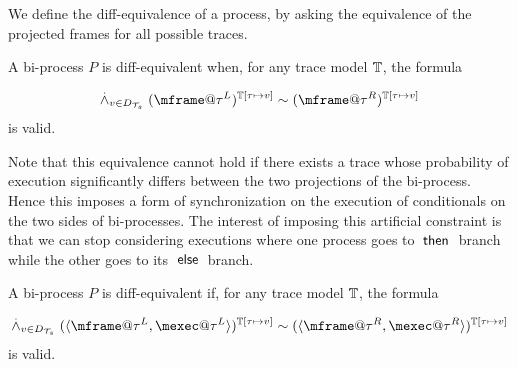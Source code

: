 We define the diff-equivalence of a process, by asking the equivalence of the projected frames for all possible traces.

\begin{definition}
  \label{def:process-equiv}
  A bi-process $P$ is diff-equivalent when,
  for any trace model $\mathbb{T}$, the formula

  \[\stackrel{.}{\wedge}_{v\in D_\XT} (\mframe@\tau^L)^{\TM[\tau\mapsto v]} \sim (\mframe@\tau^R)^{\TM[\tau \mapsto v]}\]
  is valid.
\end{definition}
Note that this equivalence cannot hold if there exists a trace
whose probability of execution significantly differs between the two
projections of the bi-process.
Hence this imposes a form of synchronization on the execution of
conditionals on the two sides of bi-processes.
The interest of imposing this artificial constraint is that we
can stop considering executions where one process goes to $\;\textsf{then}\;$
branch while the other goes to its $\;\textsf{else}\;$ branch. 
\begin{lemma}
  A bi-process $P$ is diff-equivalent if,
  for any trace model $\mathbb{T}$, the formula

  \[\stackrel{.}{\wedge}_{v\in D_\XT} (\pair{\mframe@\tau^L,\mexec@\tau^L})^{\TM[\tau\mapsto v]} \sim (\pair{\mframe@\tau^R, \mexec@\tau^R} )^{\TM[\tau \mapsto v]}\]
  is valid.
\end{lemma}

\newcommand{\In}{\mathsf{in}}
\newcommand{\Out}{\mathsf{out}}

